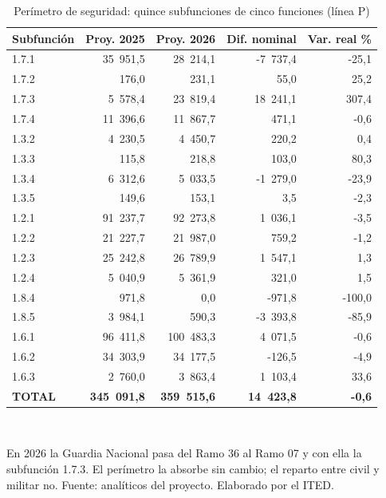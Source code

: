 \begin{table}[htbp]
\centering
\scriptsize
\caption{Perímetro de seguridad: quince subfunciones de cinco funciones (línea P)}
\label{cua:C9_1}
\begin{tabular}{lrrrr}
\toprule
\textbf{Subfunción} & \textbf{Proy. 2025} & \textbf{Proy. 2026} & \textbf{Dif. nominal} & \textbf{Var. real \%} \\
\midrule
1.7.1 & 35 951,5 & 28 214,1 & -7 737,4 & -25,1 \\
1.7.2 & 176,0 & 231,1 & 55,0 & 25,2 \\
1.7.3 & 5 578,4 & 23 819,4 & 18 241,1 & 307,4 \\
1.7.4 & 11 396,6 & 11 867,7 & 471,1 & -0,6 \\
1.3.2 & 4 230,5 & 4 450,7 & 220,2 & 0,4 \\
1.3.3 & 115,8 & 218,8 & 103,0 & 80,3 \\
1.3.4 & 6 312,6 & 5 033,5 & -1 279,0 & -23,9 \\
1.3.5 & 149,6 & 153,1 & 3,5 & -2,3 \\
1.2.1 & 91 237,7 & 92 273,8 & 1 036,1 & -3,5 \\
1.2.2 & 21 227,7 & 21 987,0 & 759,2 & -1,2 \\
1.2.3 & 25 242,8 & 26 789,9 & 1 547,1 & 1,3 \\
1.2.4 & 5 040,9 & 5 361,9 & 321,0 & 1,5 \\
1.8.4 & 971,8 & 0,0 & -971,8 & -100,0 \\
1.8.5 & 3 984,1 & 590,3 & -3 393,8 & -85,9 \\
1.6.1 & 96 411,8 & 100 483,3 & 4 071,5 & -0,6 \\
1.6.2 & 34 303,9 & 34 177,5 & -126,5 & -4,9 \\
1.6.3 & 2 760,0 & 3 863,4 & 1 103,4 & 33,6 \\
\midrule
\textbf{TOTAL} & \textbf{345 091,8} & \textbf{359 515,6} & \textbf{14 423,8} & \textbf{-0,6} \\
\bottomrule
\end{tabular}
\\[2pt]\begin{minipage}{0.92\textwidth}\scriptsize En 2026 la Guardia Nacional pasa del Ramo 36 al Ramo 07 y con ella la subfunción 1.7.3. El perímetro la absorbe sin cambio; el reparto entre civil y militar no. Fuente: analíticos del proyecto. Elaborado por el ITED.\end{minipage}
\end{table}
